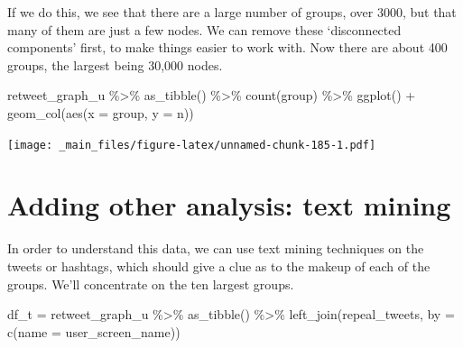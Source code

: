 \documentclass[
]{book}
\newenvironment{Shaded}{\begin{snugshade}}{\end{snugshade}}
\newcommand{\AttributeTok}[1]{\textcolor[rgb]{0.77,0.63,0.00}{#1}}
\newcommand{\FunctionTok}[1]{\textcolor[rgb]{0.00,0.00,0.00}{#1}}
\newcommand{\NormalTok}[1]{#1}
\newcommand{\OtherTok}[1]{\textcolor[rgb]{0.56,0.35,0.01}{#1}}
\newcommand{\SpecialCharTok}[1]{\textcolor[rgb]{0.00,0.00,0.00}{#1}}
\newcommand{\StringTok}[1]{\textcolor[rgb]{0.31,0.60,0.02}{#1}}
\begin{document}
If we do this, we see that there are a large number of groups, over 3000, but that many of them are just a few nodes. We can remove these `disconnected components' first, to make things easier to work with. Now there are about 400 groups, the largest being 30,000 nodes.

\begin{Shaded}
\begin{Highlighting}[]
\NormalTok{retweet\_graph\_u }\SpecialCharTok{\%\textgreater{}\%} \FunctionTok{as\_tibble}\NormalTok{() }\SpecialCharTok{\%\textgreater{}\%} \FunctionTok{count}\NormalTok{(group) }\SpecialCharTok{\%\textgreater{}\%} \FunctionTok{ggplot}\NormalTok{() }\SpecialCharTok{+} \FunctionTok{geom\_col}\NormalTok{(}\FunctionTok{aes}\NormalTok{(}\AttributeTok{x =}\NormalTok{ group, }\AttributeTok{y =}\NormalTok{ n))}
\end{Highlighting}
\end{Shaded}

\texttt{[image: \_main\_files/figure-latex/unnamed-chunk-185-1.pdf]}

\hypertarget{adding-other-analysis-text-mining}{%
\section{Adding other analysis: text mining}\label{adding-other-analysis-text-mining}}

In order to understand this data, we can use text mining techniques on the tweets or hashtags, which should give a clue as to the makeup of each of the groups. We'll concentrate on the ten largest groups.

\begin{Shaded}
\begin{Highlighting}[]
\NormalTok{df\_t }\OtherTok{=}\NormalTok{ retweet\_graph\_u }\SpecialCharTok{\%\textgreater{}\%} \FunctionTok{as\_tibble}\NormalTok{() }\SpecialCharTok{\%\textgreater{}\%}  \FunctionTok{left\_join}\NormalTok{(repeal\_tweets, }\AttributeTok{by =} \FunctionTok{c}\NormalTok{(}\StringTok{\textquotesingle{}name\textquotesingle{}} \OtherTok{=} \StringTok{\textquotesingle{}user\_screen\_name\textquotesingle{}}\NormalTok{))}
\end{Highlighting}
\end{Shaded}
\end{document}
